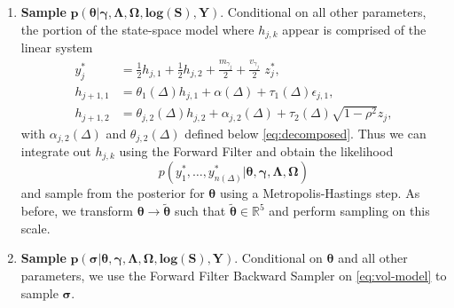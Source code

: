 \begin{enumerate}
  \begin{enumerate}
    \item \textbf{Sample} $\boldsymbol{p(\theta|\gamma,\Lambda,\Omega,\mbox{log}(S), Y)}$. Conditional on all other parameters, the portion of the state-space model where $h_{j,k}$ appear is comprised of the linear system
      \begin{align}
        y_j^* &= \frac{1}{2}h_{j,1} + \frac{1}{2} h_{j,2} + \frac{m_{\gamma_j}}{2} + \frac{v_{\gamma_j}}{2} \,\, z^*_{j}, \nonumber  \\
  	h_{j+1,1} &= \theta_{1}(\Delta) h_{j,1} + \alpha(\Delta) + \tau_1(\Delta)  \epsilon_{j,1}, \label{eq:vol-model} \\
	h_{j+1,2} &= \theta_{j,2}(\Delta) h_{j,2} + \alpha_{j,2}(\Delta) + \tau_2(\Delta) \sqrt{1 - \rho^2} z_j, \nonumber
      \end{align}
      with $\alpha_{j,2}(\Delta)$ and $\theta_{j,2}(\Delta)$ defined
      below \eqref{eq:decomposed}. Thus we can integrate out $h_{j,k}$
      using the Forward Filter and obtain the likelihood
      \[p(y^*_1, \ldots, y_{n(\Delta)}^* |
        \boldsymbol{\theta},\boldsymbol{\gamma},\boldsymbol{\Lambda},\boldsymbol{\Omega})\]
      and sample from the posterior for
      $\boldsymbol{\theta}$ using a Metropolis-Hastings step. As
      before, we transform
      $\boldsymbol{\theta} \to \tilde{\boldsymbol{\theta}}$ such that
      $\tilde{\boldsymbol{\theta}} \in \mathbb{R}^5$ and perform
      sampling on this scale.

      \item \textbf{Sample} $\boldsymbol{p(\sigma | \theta, \gamma,\Lambda,\Omega,\mbox{log}(S), Y)}$. Conditional on $\boldsymbol{\theta}$ and all other parameters, we use the Forward Filter Backward Sampler on \eqref{eq:vol-model} to sample $\boldsymbol{\sigma}$.
  \end{enumerate}


\end{enumerate}
